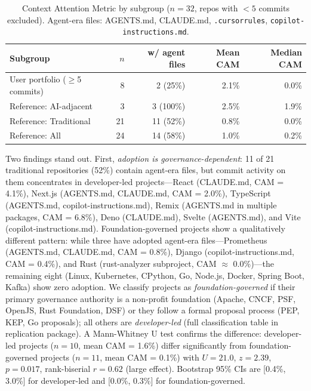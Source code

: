 \documentclass[sigconf, nonacm, anonymous=false]{acmart}
\begin{document}
\begin{table}[ht]
\centering
\small
\begin{tabularx}{\textwidth}{lrrrr}
\toprule
\textbf{Subgroup} & \textbf{$n$} & \textbf{w/ agent files} & \textbf{Mean CAM} & \textbf{Median CAM} \\
\midrule
User portfolio ($\geq$5 commits) & 8 & 2 (25\%) & 2.1\% & 0.0\% \\
Reference: AI-adjacent & 3 & 3 (100\%) & 2.5\% & 1.9\% \\
Reference: Traditional & 21 & 11 (52\%) & 0.8\% & 0.0\% \\
\midrule
Reference: All & 24 & 14 (58\%) & 1.0\% & 0.2\% \\
\bottomrule
\end{tabularx}
\caption{Context Attention Metric by subgroup ($n=32$, repos with $<5$ commits excluded). Agent-era files: AGENTS.md, CLAUDE.md, \texttt{.cursorrules}, \texttt{copilot-instructions.md}.}
\label{tab:cam}
\end{table}

Two findings stand out. First, \textit{adoption is governance-dependent}: 11 of 21 traditional repositories (52\%) contain agent-era files, but commit activity on them concentrates in developer-led projects---React (CLAUDE.md, CAM = 4.1\%), Next.js (AGENTS.md, CLAUDE.md, CAM = 2.0\%), TypeScript (AGENTS.md, copilot-instructions.md), Remix (AGENTS.md in multiple packages, CAM = 6.8\%), Deno (CLAUDE.md), Svelte (AGENTS.md), and Vite (copilot-instructions.md). Foundation-governed projects show a qualitatively different pattern: while three have adopted agent-era files---Prometheus (AGENTS.md, CLAUDE.md, CAM = 0.8\%), Django (copilot-instructions.md, CAM = 0.4\%), and Rust (rust-analyzer subproject, CAM $\approx$ 0.0\%)---the remaining eight (Linux, Kubernetes, CPython, Go, Node.js, Docker, Spring Boot, Kafka) show zero adoption. We classify projects as \textit{foundation-governed} if their primary governance authority is a non-profit foundation (Apache, CNCF, PSF, OpenJS, Rust Foundation, DSF) or they follow a formal proposal process (PEP, KEP, Go proposals); all others are \textit{developer-led} (full classification table in replication package). A Mann-Whitney U test confirms the difference: developer-led projects ($n=10$, mean CAM = 1.6\%) differ significantly from foundation-governed projects ($n=11$, mean CAM = 0.1\%) with $U=21.0$, $z=2.39$, $p=0.017$, rank-biserial $r=0.62$ (large effect). Bootstrap 95\% CIs are [0.4\%, 3.0\%] for developer-led and [0.0\%, 0.3\%] for foundation-governed.
\end{document}
